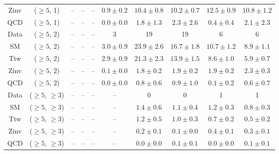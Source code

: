 \begin{table}[h!]
{\begin{tabular}{cccccccccc}
	Zinv & ($\ge5$, 1) & -- & -- & -- & $0.9\pm 0.2$ & $10.4\pm 0.8$ & $10.2\pm 0.7$ & $12.5\pm 0.9$ & $10.8\pm 1.2$ \\[0.5ex] 
	QCD & ($\ge5$, 1) & -- & -- & -- & $0.0\pm 0.0$ & $1.8\pm 1.3$ & $2.3\pm 2.6$ & $0.4\pm 0.4$ & $2.1\pm 2.3$ \\[0.5ex] 
	Data & ($\ge5$, 2) & -- & -- & -- & 3 & 19 & 19 & 6 & 6 \\[0.5ex] 
	SM & ($\ge5$, 2) & -- & -- & -- & $3.0\pm 0.9$ & $23.9\pm 2.6$ & $16.7\pm 1.8$ & $10.7\pm 1.2$ & $8.9\pm 1.1$ \\[0.5ex] 
	Ttw & ($\ge5$, 2) & -- & -- & -- & $2.9\pm 0.9$ & $21.3\pm 2.3$ & $13.9\pm 1.5$ & $8.6\pm 1.0$ & $5.9\pm 0.7$ \\[0.5ex] 
	Zinv & ($\ge5$, 2) & -- & -- & -- & $0.1\pm 0.0$ & $1.8\pm 0.2$ & $1.9\pm 0.2$ & $1.9\pm 0.2$ & $2.3\pm 0.3$ \\[0.5ex] 
	QCD & ($\ge5$, 2) & -- & -- & -- & $0.0\pm 0.0$ & $0.8\pm 0.6$ & $0.9\pm 1.0$ & $0.1\pm 0.2$ & $0.6\pm 0.7$ \\[0.5ex] 
	Data & ($\ge5$, $\ge3$) & -- & -- & -- & -- & 0 & 0 & 1 & 1 \\[0.5ex] 
	SM & ($\ge5$, $\ge3$) & -- & -- & -- & -- & $1.4\pm 0.6$ & $1.1\pm 0.4$ & $1.2\pm 0.3$ & $0.8\pm 0.3$ \\[0.5ex] 
	Ttw & ($\ge5$, $\ge3$) & -- & -- & -- & -- & $1.2\pm 0.5$ & $1.0\pm 0.3$ & $0.7\pm 0.2$ & $0.5\pm 0.2$ \\[0.5ex] 
	Zinv & ($\ge5$, $\ge3$) & -- & -- & -- & -- & $0.2\pm 0.1$ & $0.1\pm 0.0$ & $0.4\pm 0.1$ & $0.3\pm 0.1$ \\[0.5ex] 
	QCD & ($\ge5$, $\ge3$) & -- & -- & -- & -- & $0.0\pm 0.0$ & $0.1\pm 0.1$ & $0.0\pm 0.0$ & $0.1\pm 0.1$ \\[0.5ex] 
	\hline
	\hline
\end{tabular}}
\end{table}
